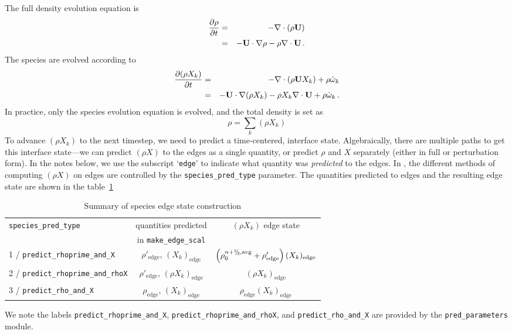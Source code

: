The full density evolution equation is
\begin{eqnarray}
\frac{\partial\rho}{\partial t} &=& -\nabla\cdot(\rho{\bf U}) \nonumber \\
&=& -{\bf U}\cdot\nabla\rho - \rho\nabla\cdot{\bf U} \, . \label{rho equation}
\end{eqnarray}
The species are evolved according to
\begin{eqnarray}
\frac{\partial(\rho X_k)}{\partial t} &=& -\nabla\cdot(\rho{\bf U} X_k) + \rho \dot{\omega}_k \nonumber \\
&=& -{\bf U}\cdot\nabla(\rho X_k) - \rho X_k \nabla\cdot{\bf U} + \rho \dot{\omega}_k \, . \label{species equation}
\end{eqnarray}
In practice, only the species evolution equation is evolved, and the
total density is set as
\begin{equation}
\rho = \sum_k (\rho X_k)
\end{equation}
To advance $(\rho X_k)$ to the next timestep, we need to predict a
time-centered, interface state.  Algebraically, there are multiple
paths to get this interface state---we can predict $(\rho X)$ to the
edges as a single quantity, or predict $\rho$ and $X$ separately
(either in full or perturbation form).  In the notes below, we use the
subscript `{\tt edge}' to indicate what quantity was {\em predicted} to the
edges.  In \maestro, the different methods of computing $(\rho X)$ on
edges are controlled by the {\tt species\_pred\_type} parameter.  The
quantities predicted to edges and the 
resulting edge state are shown in the table~\ref{table:pred:species}

\begin{table}[h]
\centering
\caption{Summary of species edge state construction}
\label{table:pred:species}
\renewcommand{\arraystretch}{1.5}
\begin{tabular}{l|c|c}
\hline
\hline
{\tt species\_pred\_type} &   {quantities predicted} & {$(\rho X_k)$ edge state} \\[-5pt]
 & {in {\tt make\_edge\_scal}} & \\
\hline 
1 / {\tt predict\_rhoprime\_and\_X}  &  
  $\rho'_\mathrm{edge}$, $(X_k)_\mathrm{edge}$ &
  $\left(\rho_0^{n+\myhalf,{\rm avg}}  
  + \rho'_\mathrm{edge} \right)(X_k)_\mathrm{edge}$ \\
2 / {\tt predict\_rhoprime\_and\_rhoX}  &  
  $\rho'_\mathrm{edge}$, $(\rho X_k)_\mathrm{edge}$ &
  $(\rho X_k)_\mathrm{edge}$ \\
3 / {\tt predict\_rho\_and\_X}  &  
  $\rho_\mathrm{edge}$, $(X_k)_\mathrm{edge}$ &
  $\rho_\mathrm{edge} (X_k)_\mathrm{edge}$ \\
\hline
\end{tabular}
\end{table}
We note the labels {\tt predict\_rhoprime\_and\_X}, {\tt predict\_rhoprime\_and\_rhoX}, and
{\tt predict\_rho\_and\_X} are provided by the {\tt pred\_parameters}
module.




